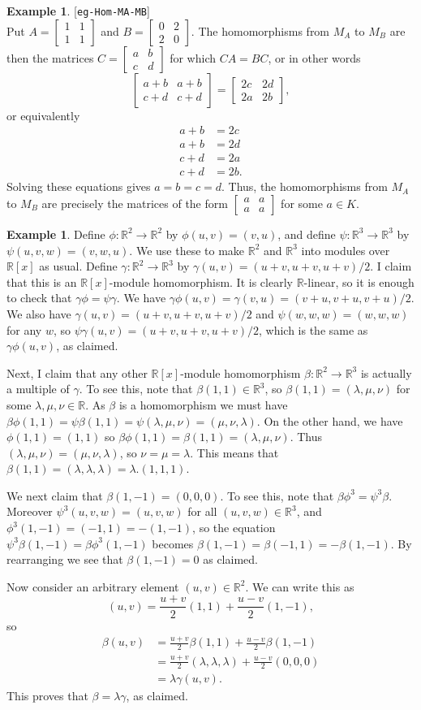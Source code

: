 \documentclass{amsart}
\newcommand{\lbl}[1]{\label{#1}\textup{[\texttt{#1}]}\ \\}
\newcommand{\lbl}{\label}
\newcommand{\bbm}       {\left[\begin{matrix}}
\newcommand{\bsm}       {\left[\begin{smallmatrix}}
\newcommand{\ebm}       {\end{matrix}\right]}
\newcommand{\esm}       {\end{smallmatrix}\right]}
\newcommand{\R}         {{\mathbb{R}}}
\newcommand{\bt}        {\beta}
\newcommand{\gm}        {\gamma}
\newcommand{\lm}        {\lambda}
\newcommand{\xra}       {\xrightarrow}
\renewcommand{\:}{\colon}
\theoremstyle{definition}
\newtheorem{example}[theorem]{Example}
\begin{document}
\begin{example}\lbl{eg-Hom-MA-MB}
 Put $A=\bsm 1&1\\1&1\esm$ and $B=\bsm 0&2\\2&0\esm$.  The
 homomorphisms from $M_A$ to $M_B$ are then the matrices
 $C=\bsm a&b\\c&d\esm$ for which $CA=BC$, or in other words 
 \[ \bbm a+b & a+b \\ c+d & c+d\ebm = 
    \bbm 2c & 2d \\ 2a & 2b \ebm,
 \]
 or equivalently
 \begin{align*}
  a+b &= 2c \\
  a+b &= 2d \\
  c+d &= 2a \\
  c+d &= 2b.
 \end{align*}
 Solving these equations gives $a=b=c=d$.  Thus, the homomorphisms
 from $M_A$ to $M_B$ are precisely the matrices of the form
 $\bsm a&a\\a&a\esm$ for some $a\in K$.
\end{example}
\begin{example}
 Define $\phi\:\R^2\xra{}\R^2$ by $\phi(u,v)=(v,u)$, and define
 $\psi\:\R^3\xra{}\R^3$ by $\psi(u,v,w)=(v,w,u)$.  We use these to
 make $\R^2$ and $\R^3$ into modules over $\R[x]$ as usual.  Define
 $\gm\:\R^2\xra{}\R^3$ by $\gm(u,v)=(u+v,u+v,u+v)/2$.  I claim that
 this is an $\R[x]$-module homomorphism.  It is clearly $\R$-linear,
 so it is enough to check that $\gm\phi=\psi\gm$.  We have
 $\gm\phi(u,v)=\gm(v,u)=(v+u,v+u,v+u)/2$.  We also have
 $\gm(u,v)=(u+v,u+v,u+v)/2$ and $\psi(w,w,w)=(w,w,w)$ for any $w$, so
 $\psi\gm(u,v)=(u+v,u+v,u+v)/2$, which is the same as $\gm\phi(u,v)$,
 as claimed.

 Next, I claim that any other $\R[x]$-module homomorphism
 $\bt\:\R^2\xra{}\R^3$ is actually a multiple of $\gm$.  To see this,
 note that $\bt(1,1)\in\R^3$, so $\bt(1,1)=(\lm,\mu,\nu)$ for some
 $\lm,\mu,\nu\in\R$.  As $\bt$ is a homomorphism we must have
 $\bt\phi(1,1)=\psi\bt(1,1)=\psi(\lm,\mu,\nu)=(\mu,\nu,\lm)$.  On the
 other hand, we have $\phi(1,1)=(1,1)$ so
 $\bt\phi(1,1)=\bt(1,1)=(\lm,\mu,\nu)$.  Thus
 $(\lm,\mu,\nu)=(\mu,\nu,\lm)$, so $\nu=\mu=\lm$.  This means that
 $\bt(1,1)=(\lm,\lm,\lm)=\lm.(1,1,1)$. 
 
 We next claim that $\bt(1,-1)=(0,0,0)$.  To see this, note that
 $\bt\phi^3=\psi^3\bt$.  Moreover $\psi^3(u,v,w)=(u,v,w)$ for all
 $(u,v,w)\in\R^3$, and $\phi^3(1,-1)=(-1,1)=-(1,-1)$, so the equation
 $\psi^3\bt(1,-1)=\bt\phi^3(1,-1)$ becomes
 $\bt(1,-1)=\bt(-1,1)=-\bt(1,-1)$.  By rearranging we see that
 $\bt(1,-1)=0$ as claimed.

 Now consider an arbitrary element $(u,v)\in\R^2$.  We can write this
 as 
 \[ (u,v) = \frac{u+v}{2} (1,1) + \frac{u-v}{2} (1,-1), \]
 so 
 \begin{align*}
  \bt(u,v) &= \frac{u+v}{2} \bt(1,1) + \frac{u-v}{2} \bt(1,-1) \\
           &= \frac{u+v}{2} (\lm,\lm,\lm) + \frac{u-v}{2}(0,0,0) \\
           &= \lm\gm(u,v).
 \end{align*}
 This proves that $\bt=\lm\gm$, as claimed.
\end{example}
\end{document}
